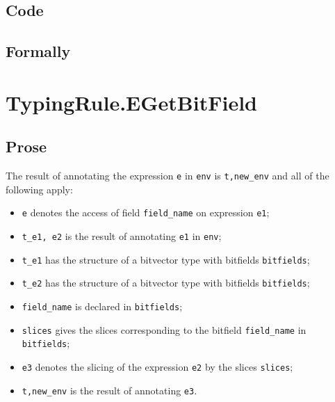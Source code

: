 \documentclass{book}
\begin{document}
 \subsection{Code}

\begin{emptyformal}
    \subsection{Formally}
\end{emptyformal}


\section{TypingRule.EGetBitField \label{sec:TypingRule.EGetBitField}}

  \subsection{Prose}
  The result of annotating the expression \texttt{e} in \texttt{env} is
\texttt{t,new\_env} and all of the following apply:
  \begin{itemize}
  \item \texttt{e} denotes the access of field \texttt{field\_name} on expression \texttt{e1};
  \item \texttt{t\_e1, e2} is the result of annotating \texttt{e1} in \texttt{env};
  \item \texttt{t\_e1} has the structure of a bitvector type with bitfields \texttt{bitfields};
  \item \texttt{t\_e2} has the structure of a bitvector type with bitfields \texttt{bitfields};
  \item \texttt{field\_name} is declared in \texttt{bitfields};
  \item \texttt{slices} gives the slices corresponding to the bitfield \texttt{field\_name}
    in \texttt{bitfields};
  \item \texttt{e3} denotes the slicing of the expression \texttt{e2} by the slices \texttt{slices};
  \item \texttt{t,new\_env} is the result of annotating \texttt{e3}.
  \end{itemize}
\end{document}
